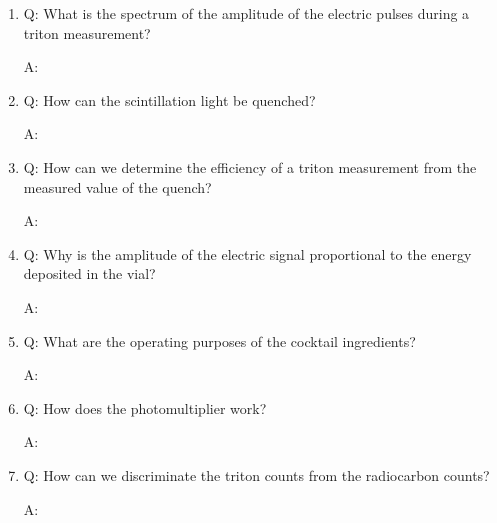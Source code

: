 \begin{enumerate}
    \item Q: What is the spectrum of the amplitude of the electric pulses during a triton
measurement?
    \begin{displayquote}
        A: 
    \end{displayquote}
    
    \item Q: How can the scintillation light be quenched?
    \begin{displayquote}
        A: 
    \end{displayquote}
    
    \item Q: How can we determine the efficiency of a triton measurement from the measured
value of the quench?
    \begin{displayquote}
        A: 
    \end{displayquote}
    
    \item Q: Why is the amplitude of the electric signal proportional to the energy deposited in the vial?
    \begin{displayquote}
        A: 
    \end{displayquote}
    
    \item Q: What are the operating purposes of the cocktail ingredients?
    \begin{displayquote}
        A: 
    \end{displayquote}
    
    \item Q: How does the photomultiplier work?
    \begin{displayquote}
        A: 
    \end{displayquote}
    
    \item Q: How can we discriminate the triton counts from the radiocarbon counts?
    \begin{displayquote}
        A: 
    \end{displayquote}
\end{enumerate}